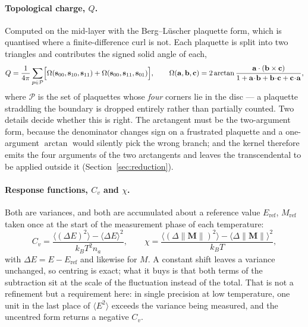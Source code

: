 \documentclass[11pt,a4paper]{article}
\newcommand{\vs}{\mathbf{s}}
\newcommand{\vM}{\mathbf{M}}
\begin{document}
\paragraph{Topological charge, $Q$.} Computed on the mid-layer with the
Berg--L\"uscher plaquette form, which is quantised where a finite-difference
curl is not. Each plaquette is split into two triangles and contributes the
signed solid angle of each,
%
\begin{equation}
Q = \frac{1}{4\pi} \sum_{p \in \mathcal{P}} \Bigl[
  \Omega(\vs_{00}, \vs_{10}, \vs_{11})
+ \Omega(\vs_{00}, \vs_{11}, \vs_{01}) \Bigr],
\qquad
\Omega(\mathbf{a},\mathbf{b},\mathbf{c}) = 2 \arctan
  \frac{\mathbf{a} \cdot (\mathbf{b} \times \mathbf{c})}
       {1 + \mathbf{a}\!\cdot\!\mathbf{b} + \mathbf{b}\!\cdot\!\mathbf{c}
          + \mathbf{c}\!\cdot\!\mathbf{a}} ,
\label{eq:obs-Q}
\end{equation}
%
where $\mathcal{P}$ is the set of plaquettes whose \emph{four} corners lie in
the disc --- a plaquette straddling the boundary is dropped entirely rather than
partially counted. Two details decide whether this is right. The arctangent must
be the two-argument form, because the denominator changes sign on a frustrated
plaquette and a one-argument $\arctan$ would silently pick the wrong branch;
and the kernel therefore emits the four arguments of the two arctangents and
leaves the transcendental to be applied outside it
(Section~\ref{sec:reduction}).

\paragraph{Response functions, $C_v$ and $\chi$.} Both are variances, and both
are accumulated about a reference value $E_{\mathrm{ref}}$, $M_{\mathrm{ref}}$
taken once at the start of the measurement phase of each temperature:
%
\begin{equation}
C_v = \frac{\langle (\Delta E)^2 \rangle - \langle \Delta E \rangle^2}
           {k_B T^2 n_a},
\qquad
\chi = \frac{\langle (\Delta \lVert\vM\rVert)^2 \rangle
             - \langle \Delta \lVert\vM\rVert \rangle^2}{k_B T},
\label{eq:obs-response}
\end{equation}
%
with $\Delta E = E - E_{\mathrm{ref}}$ and likewise for $M$. A constant shift
leaves a variance unchanged, so centring is exact; what it buys is that both
terms of the subtraction sit at the scale of the fluctuation instead of the
total. That is not a refinement but a requirement here: in single precision at
low temperature, one unit in the last place of $\langle E^2 \rangle$ exceeds the
variance being measured, and the uncentred form returns a negative $C_v$.
\end{document}
